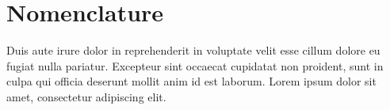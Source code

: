 %
%
\chapter*{Nomenclature}
\label{c:nomenclature}
%
%
\acuseall
%
\begin{spacing}{1.3}
%
Duis aute irure dolor in reprehenderit in voluptate velit esse cillum dolore eu fugiat nulla pariatur.
Excepteur sint occaecat cupidatat non proident, sunt in culpa qui officia deserunt mollit anim id est laborum.
Lorem ipsum dolor sit amet, consectetur adipiscing elit. 
%
\end{spacing}
%
\vspace*{-0.01cm}
%
\begin{spacing}{0.5}
%
%
\printacronyms[name={\normalsize Latin letters},sort=true, include-classes=latin]
%
%
\printacronyms[name={\normalsize Greek letters},sort=true, include-classes=greek]
%
%
\printacronyms[name={\normalsize Superscripts},sort=true, include-classes=superscript]
%
%
\printacronyms[name={\normalsize Subscripts},sort=true, include-classes=subscripts]
%
%
%
\printacronyms[name={\normalsize Other},sort=true, include-classes=other]
%
\end{spacing}
%
%
%
